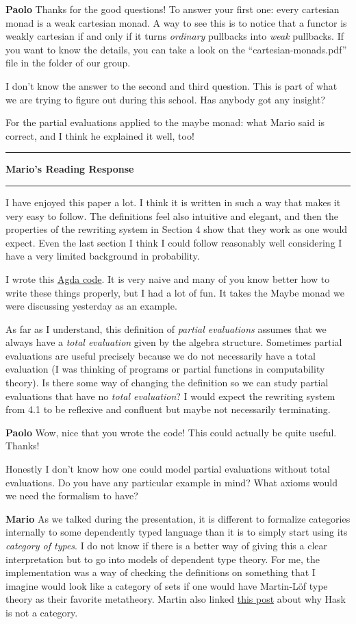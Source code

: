 \documentclass{amsart}
\newcommand{\iam}[1]{
  \vspace{0.25em}
  \hrule
  \vspace{0.25em}
  \textbf{{#1}'s Reading Response}
  \vspace{0.25em}
  \hrule
  \vspace{1em}
}
\newcommand{\respond}[1]{
  \vspace{1em} \textbf{#1}
}
\begin{document}
\respond{Paolo} Thanks for the good questions! To answer your first one: every cartesian monad is a weak cartesian monad. A way to see this is to notice that a functor is weakly cartesian if and only if it turns \emph{ordinary} pullbacks into \emph{weak} pullbacks. If you want to know the details, you can take a look on the ``cartesian-monads.pdf'' file in the folder of our group.

I don't know the answer to the second and third question. This is part of what we are trying to figure out during this school. Has anybody got any insight?

For the partial evaluations applied to the maybe monad: what Mario said is correct, and I think he explained it well, too!

\iam{Mario} I have enjoyed this paper a lot. I think it is written
in such a way that makes it very easy to follow. The definitions feel
also intuitive and elegant, and then the properties of the rewriting
system in Section 4 show that they work as one would expect.  Even the
last section I think I could follow reasonably well considering I have
a very limited background in probability.

I wrote this
\href{https://gist.github.com/mroman42/67babea2b5c13aef3a2a4eb344f635cc}{Agda
  code}.  It is very naive and many of you know better how to write
these things properly, but I had a lot of fun. It takes the Maybe
monad we were discussing yesterday as an example.

As far as I understand, this definition of \emph{partial evaluations}
assumes that we always have a \emph{total evaluation} given by the
algebra structure.  Sometimes partial evaluations are useful precisely
because we do not necessarily have a total evaluation (I was thinking
of programs or partial functions in computability theory).  Is there
some way of changing the definition so we can study partial
evaluations that have no \emph{total evaluation}? I would expect the
rewriting system from 4.1 to be reflexive and confluent but maybe not
necessarily terminating.

\respond{Paolo} Wow, nice that you wrote the code! This could actually be quite useful. Thanks!

Honestly I don't know how one could model partial evaluations without total evaluations. Do you have any particular example in mind? What axioms would we need the formalism to have?

\respond{Mario} As we talked during the presentation, it is different
to formalize categories internally to some dependently typed language
than it is to simply start using its \textit{category of types}.  I do
not know if there is a better way of giving this a clear
interpretation but to go into models of dependent type theory. For me,
the implementation was a way of checking the definitions on something
that I imagine would look like a category of sets if one would have
Martin-Löf type theory as their favorite metatheory.  Martin also
linked \href{http://math.andrej.com/2016/08/06/hask-is-not-a-category/comment-page-1/}{this
  post}
about why Hask is not a category.
\end{document}
